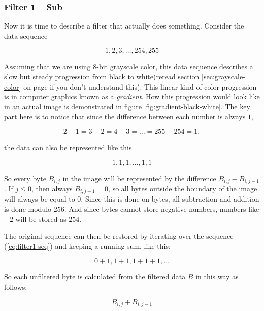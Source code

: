 \subsubsection{Filter 1 -- Sub}

Now it is time to describe a filter that actually does
something. Consider the data sequence

\begin{equation}
  \label{eq:1-seq}
  1,2,3,\dots,254,255
\end{equation}

Assuming that we are using 8-bit grayscale color, this data sequence
describes a slow but steady progression from black to white(reread
section \ref{sec:grayscale-color} on page
\pageref{sec:grayscale-color} if you don't understand this). This
linear kind of color progression is in computer graphics known as a
\textit{gradient}\cite{sayood2003lossless}. How this progression would
look like in an actual image is demonstrated in figure
\ref{fig:gradient-black-white}. The key part here is to notice that
since the difference between each number is always $1$,

\begin{equation*}
  2-1=3-2=4-3=\dots=255-254=1,
\end{equation*}

the data can also be represented
like this

\begin{equation}
  \label{eq:filter1-seq}
  1,1,1,\dots,1,1
\end{equation}

So every byte $B_{i,j}$ in the image will be represented by the
difference $B_{i,j} - B_{i,j-1}$. If $j \le 0$, then always $B_{i,j-1}
= 0$, so all bytes outside the boundary of the image will always be
equal to $0$. Since this is done on bytes, all subtraction and
addition is done modulo $256$. And since bytes cannot store negative
numbers, numbers like $-2$ will be stored as $254$.

The original sequence can then be restored by iterating over the
sequence (\ref{eq:filter1-seq}) and keeping a running sum, like this:

\begin{equation*}
  0+1,1+1,1+1+1,\dots
\end{equation*}

So each unfiltered byte is calculated from the filtered data $B$ in
this way as follows:

\begin{equation*}
  B_{i,j} + B_{i,j-1}
\end{equation*}

